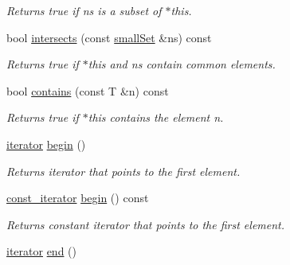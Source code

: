 \begin{CompactItemize}
\begin{CompactList}\small\item\em Returns true if ns is a subset of $\ast$this. \item\end{CompactList}\item 
\hypertarget{classdai_1_1smallSet_c9180f866aa64a6021263a03ec4fab09}{
bool \hyperlink{classdai_1_1smallSet_c9180f866aa64a6021263a03ec4fab09}{intersects} (const \hyperlink{classdai_1_1smallSet}{smallSet} \&ns) const }
\label{classdai_1_1smallSet_c9180f866aa64a6021263a03ec4fab09}

\begin{CompactList}\small\item\em Returns true if $\ast$this and ns contain common elements. \item\end{CompactList}\item 
\hypertarget{classdai_1_1smallSet_82eff80e70adf8c0a541c0a505522b32}{
bool \hyperlink{classdai_1_1smallSet_82eff80e70adf8c0a541c0a505522b32}{contains} (const T \&n) const }
\label{classdai_1_1smallSet_82eff80e70adf8c0a541c0a505522b32}

\begin{CompactList}\small\item\em Returns true if $\ast$this contains the element n. \item\end{CompactList}\item 
\hypertarget{classdai_1_1smallSet_6a14836b896a8bb1901ea79fd45394d0}{
\hyperlink{classdai_1_1smallSet_254dd4f8cad9c7bce5522e9dbcfc4f49}{iterator} \hyperlink{classdai_1_1smallSet_6a14836b896a8bb1901ea79fd45394d0}{begin} ()}
\label{classdai_1_1smallSet_6a14836b896a8bb1901ea79fd45394d0}

\begin{CompactList}\small\item\em Returns iterator that points to the first element. \item\end{CompactList}\item 
\hypertarget{classdai_1_1smallSet_3f0650aa385a3fa8baa1903762815203}{
\hyperlink{classdai_1_1smallSet_103c819872818d14a7234a1f618a815c}{const\_\-iterator} \hyperlink{classdai_1_1smallSet_3f0650aa385a3fa8baa1903762815203}{begin} () const }
\label{classdai_1_1smallSet_3f0650aa385a3fa8baa1903762815203}

\begin{CompactList}\small\item\em Returns constant iterator that points to the first element. \item\end{CompactList}\item 
\hypertarget{classdai_1_1smallSet_9927551b475689ed06d0380f26df8eea}{
\hyperlink{classdai_1_1smallSet_254dd4f8cad9c7bce5522e9dbcfc4f49}{iterator} \hyperlink{classdai_1_1smallSet_9927551b475689ed06d0380f26df8eea}{end} ()}
\label{classdai_1_1smallSet_9927551b475689ed06d0380f26df8eea}


\end{CompactItemize}
